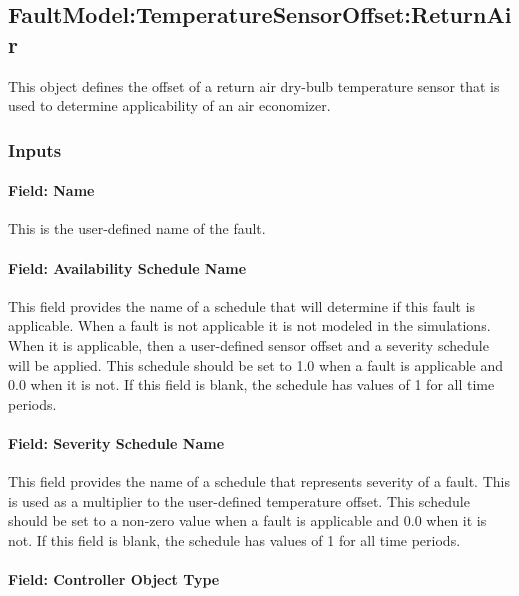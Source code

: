 \subsection{FaultModel:TemperatureSensorOffset:ReturnAir}\label{faultmodeltemperaturesensoroffsetreturnair}

This object defines the offset of a return air dry-bulb temperature sensor that is used to determine applicability of an air economizer.

\subsubsection{Inputs}\label{inputs-3-022}

\paragraph{Field: Name}\label{field-name-3-020}

This is the user-defined name of the fault.

\paragraph{Field: Availability Schedule Name}\label{field-availability-schedule-name-3-004}

This field provides the name of a schedule that will determine if this fault is applicable. When a fault is not applicable it is not modeled in the simulations. When it is applicable, then a user-defined sensor offset and a severity schedule will be applied. This schedule should be set to 1.0 when a fault is applicable and 0.0 when it is not. If this field is blank, the schedule has values of 1 for all time periods.

\paragraph{Field: Severity Schedule Name}\label{field-severity-schedule-name-3}

This field provides the name of a schedule that represents severity of a fault. This is used as a multiplier to the user-defined temperature offset. This schedule should be set to a non-zero value when a fault is applicable and 0.0 when it is not. If this field is blank, the schedule has values of 1 for all time periods.

\paragraph{Field: Controller Object Type}\label{field-controller-object-type-3}

